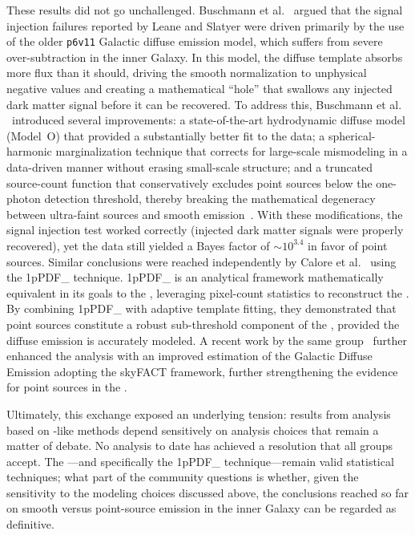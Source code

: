 These results did not go unchallenged.
Buschmann et al.~\cite{Buschmann:2020adf} argued that the signal injection failures reported by Leane and Slatyer were driven primarily by the use of the older \texttt{p6v11} Galactic diffuse emission model, which suffers from severe over-subtraction in the inner Galaxy.
In this model, the diffuse template absorbs more flux than it should, driving the smooth \GCE normalization to unphysical negative values and creating a mathematical ``hole'' that swallows any injected dark matter signal before it can be recovered.
To address this, Buschmann et al.
\ introduced several improvements: a state-of-the-art hydrodynamic diffuse model (Model~O) that provided a substantially better fit to the data; a spherical-harmonic marginalization technique that corrects for large-scale mismodeling in a data-driven manner without erasing small-scale structure; and a truncated source-count function that conservatively excludes point sources below the one-photon detection threshold, thereby breaking the mathematical degeneracy between ultra-faint sources and smooth emission~\cite{Chang:2019ars}.
With these modifications, the signal injection test worked correctly (injected dark matter signals were properly recovered), yet the data still yielded a Bayes factor of $\sim 10^{3.4}$ in favor of point sources.
Similar conclusions were reached independently by Calore et al.~\cite{Calore_2021} using the \gls{1pPDF_} technique. \Gls{1pPDF_} is an analytical framework mathematically equivalent in its goals to the \NPTF, leveraging pixel-count statistics to reconstruct the \SCD. By combining \gls{1pPDF_} with adaptive template fitting, they demonstrated that point sources constitute a robust sub-threshold component of the \GCE, provided the diffuse emission is accurately modeled.
A recent work by the same group~\cite{Manconi:2025ogr} further enhanced the analysis with an improved estimation of the Galactic Diffuse Emission adopting the skyFACT framework, further strengthening the evidence for point sources in the \GCE.

Ultimately, this exchange exposed an underlying tension: results from analysis based on \NPTF-like methods depend sensitively on analysis choices that remain a matter of debate.
No analysis to date has achieved a resolution that all groups accept. The \NPTF---and specifically the \gls{1pPDF_} technique---remain valid statistical techniques; what part of the community questions is whether, given the sensitivity to the modeling choices discussed above, the conclusions reached so far on smooth versus point-source emission in the inner Galaxy can be regarded as definitive.

